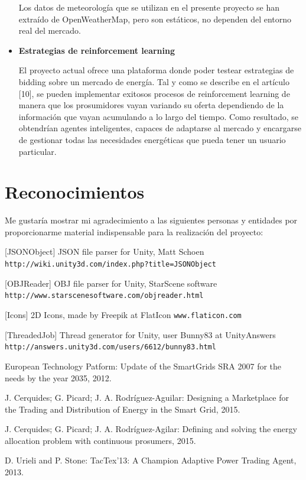 \documentclass[12pt,a4paper,openright,oneside]{article}
\numberwithin{equation}{section}
\theoremstyle{definition}
\begin{document}
\begin{itemize}
Los datos de meteorología que se utilizan en el presente proyecto se han extraído de OpenWeatherMap, pero son estáticos, no dependen del entorno real del mercado.

\item \textbf{Estrategias de reinforcement learning}

El proyecto actual ofrece una plataforma donde poder testear estrategias de bidding sobre un mercado de energía. Tal y como se describe en el artículo [10], se pueden implementar exitosos procesos de reinforcement learning de manera que los prosumidores vayan variando su oferta dependiendo de la información que vayan acumulando a lo largo del tiempo. Como resultado, se obtendrían agentes inteligentes, capaces de adaptarse al mercado y encargarse de gestionar todas las necesidades energéticas que pueda tener un usuario particular.

\end{itemize}
\normalfont

\newpage

\section*{Reconocimientos}
Me gustaría mostrar mi agradecimiento a las siguientes personas y entidades por proporcionarme material indispensable para la realización del proyecto:
\vspace{5mm}

[JSONObject] JSON file parser for Unity, Matt Schoen\newline
\texttt{ http://wiki.unity3d.com/index.php?title=JSONObject}

\vspace{5mm}
[OBJReader] OBJ file parser for Unity, StarScene software \newline
\texttt{http://www.starscenesoftware.com/objreader.html}

\vspace{5mm}
[Icons] 2D Icons, made by Freepik at FlatIcon
\newline \texttt{www.flaticon.com}

\vspace{5mm}
[ThreadedJob] Thread generator for Unity, user Bunny83 at UnityAnswers
\newline \texttt{http://answers.unity3d.com/users/6612/bunny83.html}

\begin{thebibliography}{25}
 European Technology Patform: Update of the SmartGrids SRA 2007 for the needs by the year 2035, 2012.

 J. Cerquides; G. Picard; J. A. Rodríguez-Aguilar: Designing a Marketplace for the Trading and Distribution
of Energy in the Smart Grid, 2015.

 J. Cerquides; G. Picard; J. A. Rodríguez-Agilar:
 Defining and solving the energy allocation problem with continuous prosumers, 2015.

 D. Urieli and P. Stone: TacTex’13: A Champion Adaptive Power Trading Agent, 2013.
\end{thebibliography}
\end{document}
